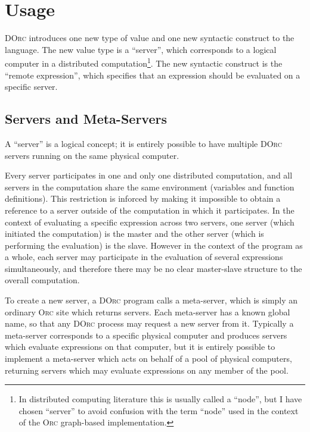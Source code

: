 \documentclass[10pt,letterpaper]{article}
\begin{document}
\section{Usage}

\textsc{DOrc} introduces one new type of value and one new syntactic construct
to the language. The new value type is a ``server'', which corresponds to a
logical computer in a distributed computation\footnote{In distributed computing
literature this is usually called a ``node'', but I have chosen ``server'' to
avoid confusion with the term ``node'' used in the context of the \textsc{Orc}
graph-based implementation.}. The new syntactic construct is the ``remote
expression'', which specifies that an expression should be evaluated on a
specific server.

\subsection{Servers and Meta-Servers}

A ``server'' is a logical concept; it is entirely possible to have multiple
\textsc{DOrc} servers running on the same physical computer.

Every server participates in one and only one distributed computation, and all
servers in the computation share the same environment (variables and function
definitions). This restriction is inforced by making it impossible to obtain a
reference to a server outside of the computation in which it participates. In
the context of evaluating a specific expression across two servers, one server
(which initiated the computation) is the master and the other server (which is
performing the evaluation) is the slave.  However in the context of the program
as a whole, each server may participate in the evaluation of several
expressions simultaneously, and therefore there may be no clear master-slave
structure to the overall computation.

To create a new server, a \textsc{DOrc} program calls a meta-server, which is
simply an ordinary \textsc{Orc} site which returns servers. Each meta-server
has a known global name, so that any \textsc{DOrc} process may request a new
server from it. Typically a meta-server corresponds to a specific physical
computer and produces servers which evaluate expressions on that computer, but
it is entirely possible to implement a meta-server which acts on behalf of a
pool of physical computers, returning servers which may evaluate expressions on
any member of the pool.
\end{document}
